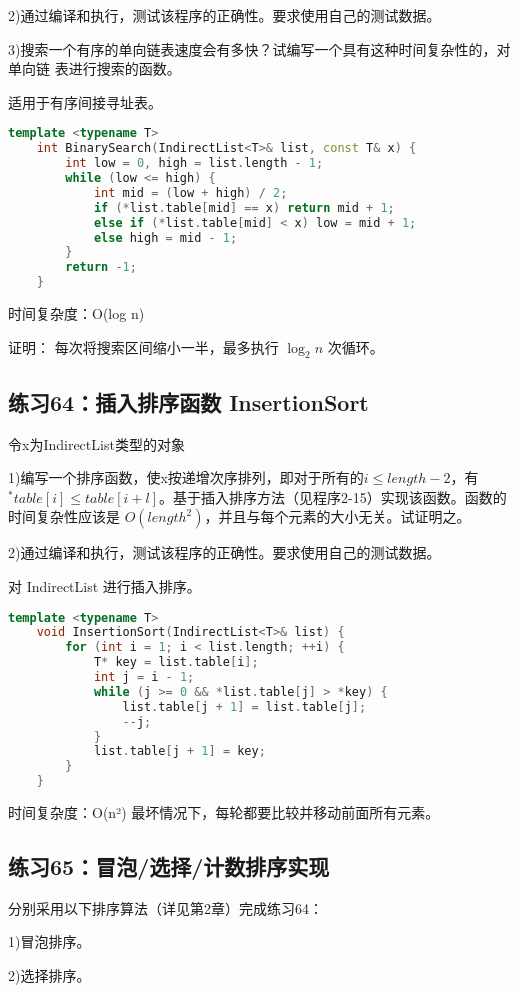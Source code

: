 \documentclass[UTF8]{ctexart}
\begin{document}
2)通过编译和执行，测试该程序的正确性。要求使用自己的测试数据。

3)搜索一个有序的单向链表速度会有多快？试编写一个具有这种时间复杂性的，对单向链
表进行搜索的函数。

适用于有序间接寻址表。


\begin{lstlisting}[language=C++]
	template <typename T>
	int BinarySearch(IndirectList<T>& list, const T& x) {
		int low = 0, high = list.length - 1;
		while (low <= high) {
			int mid = (low + high) / 2;
			if (*list.table[mid] == x) return mid + 1;
			else if (*list.table[mid] < x) low = mid + 1;
			else high = mid - 1;
		}
		return -1;
	}
\end{lstlisting}

时间复杂度：O(log n)

证明：
每次将搜索区间缩小一半，最多执行 $ \log_2 n $ 次循环。


\subsection*{练习64：插入排序函数 InsertionSort}
令x为IndirectList类型的对象

1)编写一个排序函数，使x按递增次序排列，即对于所有的$i\leq length-2$，有$^*table[i]\leq
table[i+l]$。基于插入排序方法（见程序2-15）实现该函数。函数的时间复杂性应该是
$O(length^2)$，并且与每个元素的大小无关。试证明之。

2)通过编译和执行，测试该程序的正确性。要求使用自己的测试数据。

对 IndirectList 进行插入排序。


\begin{lstlisting}[language=C++]
	template <typename T>
	void InsertionSort(IndirectList<T>& list) {
		for (int i = 1; i < list.length; ++i) {
			T* key = list.table[i];
			int j = i - 1;
			while (j >= 0 && *list.table[j] > *key) {
				list.table[j + 1] = list.table[j];
				--j;
			}
			list.table[j + 1] = key;
		}
	}
\end{lstlisting}

时间复杂度：O(n²)  
最坏情况下，每轮都要比较并移动前面所有元素。


\subsection*{练习65：冒泡/选择/计数排序实现}
分别采用以下排序算法（详见第2章）完成练习64：

1)冒泡排序。

2)选择排序。
\end{document}
